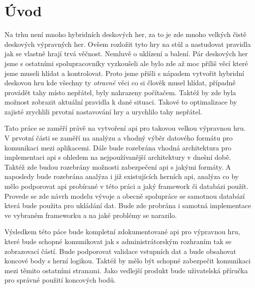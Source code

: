 \chapter{Úvod}
Na trhu není mnoho hybridních deskových her, za to je zde mnoho velkých čistě deskových výpravných her. Ovšem rozložit tyto hry na stůl a nastudovat pravidla jak se vlastně hrají trvá věčnost. Nemluvě o uklízení a balení. Pár deskových her jsme s ostatními spolupracovníky vyzkoušeli ale bylo zde až moc příliš věcí které jsme museli hlídat a kontrolovat. Proto jsme přišli s nápadem vytvořit hybridní deskovou hru kde všechny ty \textit{otravné} věci co si člověk musel hlídat, případně provádět tahy místo nepřátel, byly nahrazeny počítačem. Taktéž by zde byla možnost zobrazit aktuální pravidla k dané situaci. Takové to optimalizace by zajisté zrychlili prvotní nastavování hry a urychlilo tahy nepřátel. 

Tato práce se zaměří právě na vytvoření \gls{api} pro takovou velkou výpravnou hru. V prvotní části se zaměří na analýzu a vhodný výběr datového formátu pro komunikaci mezi aplikacemi. Dále bude rozebrána vhodná architektura pro implementaci \gls{api} s ohledem na nejpoužívanější architektury v dnešní době. Taktéž zde budou rozebrány možnosti zabezpečení \gls{api} s jakými formáty. A naposledy bude rozebrána analýza i již existujících herních \gls{api}, analýza co by mělo podporovat \gls{api} probírané v této práci a jaký framework či databázi použít. Provede se zde návrh modelu vývoje a obecně spolupráce se samotnou databází která bude použita pro ukládání dat. Bude zde probrána i samotná implementace ve vybraném frameworku a na jaké problémy se narazilo.

Výsledkem této páce bude kompletní zdokumentované \gls{api} pro výpravnou hru, které bude schopné komunikovat jak s administrátorským rozhraním tak se zobrazovací částí. Bude podporovat validace vstupních dat a bude obsahovat koncové body s herní logikou. Taktéž by mělo být schopné zabezpečit komunikaci mezi těmito ostatními stranami. Jako vedlejší produkt bude uživatelská příručka pro správné použití koncových bodů.